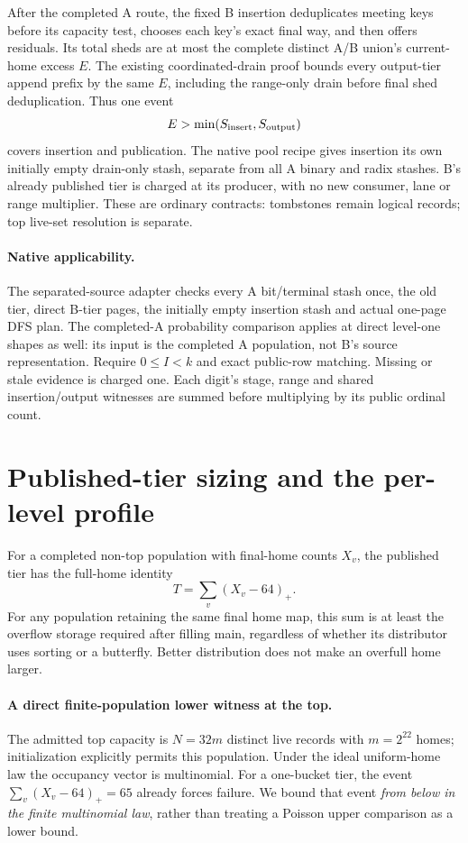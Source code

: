 \documentclass[11pt]{article}
\theoremstyle{definition}
\theoremstyle{remark}
\begin{document}
After the completed A route, the fixed B insertion deduplicates meeting
keys before its capacity test, chooses each key's exact final way, and
then offers residuals. Its total sheds are at most the complete distinct
A/B union's current-home excess $E$. The existing coordinated-drain proof
bounds every output-tier append prefix by the same $E$, including the
range-only drain before final shed deduplication. Thus one event
\[
 E>\min(S_{\rm insert},S_{\rm output})
\]
covers insertion and publication. The native pool recipe gives insertion
its own initially empty drain-only stash, separate from all A binary and
radix stashes. B's already published tier is charged at its producer, with
no new consumer, lane or range multiplier. These are ordinary contracts:
tombstones remain logical records; top live-set resolution is separate.

\paragraph{Native applicability.}
The separated-source adapter checks every A bit/terminal stash once, the old
tier, direct B-tier pages, the initially empty insertion stash and actual
one-page DFS plan. The completed-A probability comparison applies at direct
level-one shapes as well: its input is the completed A population, not B's
source representation. Require $0\le I<k$ and exact public-row matching.
Missing or stale evidence is charged one. Each digit's stage, range and
shared insertion/output witnesses are summed before multiplying by its
public ordinal count.

\section{Published-tier sizing and the per-level profile}
\label{sec:tier-sizing}
For a completed non-top population with final-home counts $X_v$, the
published tier has the full-home identity
\[
 T=\sum_v(X_v-64)_+.
\]
For any population retaining the same final home map, this sum is at least
the overflow storage required after filling main, regardless of whether
its distributor uses sorting or a butterfly. Better distribution does not
make an overfull home larger.

\paragraph{A direct finite-population lower witness at the top.}
The admitted top capacity is $N=32m$ distinct live records with $m=2^{22}$
homes; initialization explicitly permits this population. Under the ideal
uniform-home law the occupancy vector is multinomial. For a one-bucket
tier, the event $\sum_v(X_v-64)_+=65$ already forces failure. We bound that
event \emph{from below in the finite multinomial law}, rather than treating
a Poisson upper comparison as a lower bound.
\end{document}
